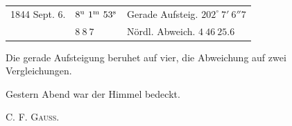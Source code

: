 \begin{center}
\setlength{\tabcolsep}{3pt}
\begin{tabular}{lll}
1844 Sept. 6. & $8^{\rm u}\ 1^{\rm m}\ 53^{\rm s}$ & Gerade Aufsteig. $202^\circ\ 7'\ 6''7$ \\
 & $8\ 8\ 7$ & Nördl. Abweich. $4\ 46\ 25.6$ \\
\end{tabular}
\end{center}

Die gerade Aufsteigung beruhet auf vier, die Abweichung auf zwei Vergleichungen.

Gestern Abend war der Himmel bedeckt.
\begin{flushright}C. F. \textsc{Gauss}.\end{flushright}
